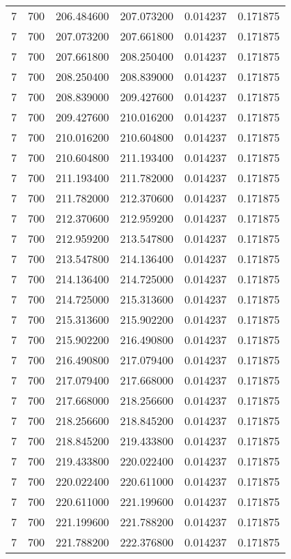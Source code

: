 \begin{longtable}{rrrrrr}
7 & 700 & 206.484600 & 207.073200 & 0.014237 & 0.171875 \\
7 & 700 & 207.073200 & 207.661800 & 0.014237 & 0.171875 \\
7 & 700 & 207.661800 & 208.250400 & 0.014237 & 0.171875 \\
7 & 700 & 208.250400 & 208.839000 & 0.014237 & 0.171875 \\
7 & 700 & 208.839000 & 209.427600 & 0.014237 & 0.171875 \\
7 & 700 & 209.427600 & 210.016200 & 0.014237 & 0.171875 \\
7 & 700 & 210.016200 & 210.604800 & 0.014237 & 0.171875 \\
7 & 700 & 210.604800 & 211.193400 & 0.014237 & 0.171875 \\
7 & 700 & 211.193400 & 211.782000 & 0.014237 & 0.171875 \\
7 & 700 & 211.782000 & 212.370600 & 0.014237 & 0.171875 \\
7 & 700 & 212.370600 & 212.959200 & 0.014237 & 0.171875 \\
7 & 700 & 212.959200 & 213.547800 & 0.014237 & 0.171875 \\
7 & 700 & 213.547800 & 214.136400 & 0.014237 & 0.171875 \\
7 & 700 & 214.136400 & 214.725000 & 0.014237 & 0.171875 \\
7 & 700 & 214.725000 & 215.313600 & 0.014237 & 0.171875 \\
7 & 700 & 215.313600 & 215.902200 & 0.014237 & 0.171875 \\
7 & 700 & 215.902200 & 216.490800 & 0.014237 & 0.171875 \\
7 & 700 & 216.490800 & 217.079400 & 0.014237 & 0.171875 \\
7 & 700 & 217.079400 & 217.668000 & 0.014237 & 0.171875 \\
7 & 700 & 217.668000 & 218.256600 & 0.014237 & 0.171875 \\
7 & 700 & 218.256600 & 218.845200 & 0.014237 & 0.171875 \\
7 & 700 & 218.845200 & 219.433800 & 0.014237 & 0.171875 \\
7 & 700 & 219.433800 & 220.022400 & 0.014237 & 0.171875 \\
7 & 700 & 220.022400 & 220.611000 & 0.014237 & 0.171875 \\
7 & 700 & 220.611000 & 221.199600 & 0.014237 & 0.171875 \\
7 & 700 & 221.199600 & 221.788200 & 0.014237 & 0.171875 \\
7 & 700 & 221.788200 & 222.376800 & 0.014237 & 0.171875 \\

\end{longtable}
